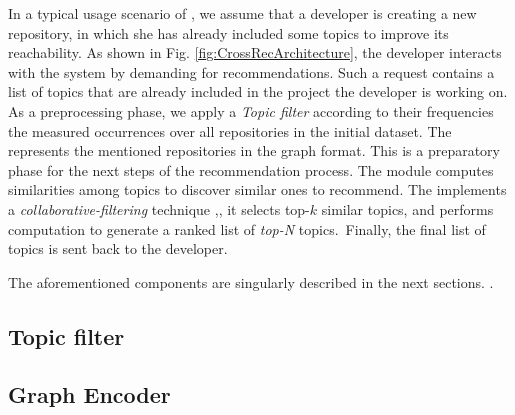 
In a typical usage scenario of \CT, we assume that a developer is creating a new \GH repository, in which she has already included some topics to improve its reachability.
As shown in Fig. \ref{fig:CrossRecArchitecture}, the developer interacts with the system by demanding for recommendations.
Such a request contains a list of topics that are already included in the project the developer is working on. As a preprocessing phase, we apply a \emph{Topic filter} according to their frequencies \ie the measured occurrences over all repositories in the initial dataset. 
The  represents
the mentioned repositories in the graph format. This is a preparatory phase for the next steps of the recommendation process. The  module computes similarities among topics to discover similar ones to recommend. The  
implements a \emph{collaborative-filtering} technique
\cite{Aggarwal2016},\cite{Zhao:2010:UCR:1748610.1749278}, it selects top-$k$ similar topics, and performs computation to generate a ranked list of \emph{top-N}
topics.~Finally, the final list of topics is sent back to the developer.

The aforementioned components are singularly described in the next sections.
. %

\subsection{Topic filter} 


\subsection{Graph Encoder} \label{sec:DataEncoder}

